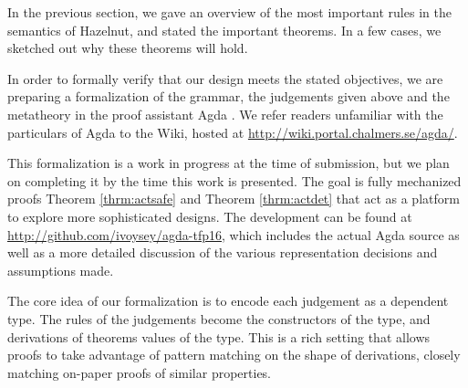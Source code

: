 In the previous section, we gave an overview of the most important rules in the semantics of Hazelnut, and stated the important theorems. In a few cases, we sketched out why these theorems will hold.

In order to formally verify that our design meets the stated objectives, we are preparing a formalization of the grammar, the judgements given above and the metatheory 
in the proof assistant Agda \cite{norell:thesis}. We refer readers
unfamiliar with the particulars of Agda to the Wiki, hosted
at \url{http://wiki.portal.chalmers.se/agda/}.

This formalization is a work in progress at the time of submission, but we plan on completing it by the time this work is presented. The
goal is fully mechanized proofs Theorem \ref{thrm:actsafe} and
Theorem \ref{thrm:actdet} that act as a platform to explore more sophisticated designs. The development can be found at
\url{http://github.com/ivoysey/agda-tfp16}, which includes the actual Agda
source as well as a more detailed discussion of the various representation
decisions and assumptions made.

The core idea of our formalization is to encode each judgement as a
dependent type. The rules of the judgements become the constructors of the
type, and derivations of theorems values of the type. This is a rich
setting that allows proofs to take advantage of pattern matching on the
shape of derivations, closely matching on-paper proofs of similar
properties.
